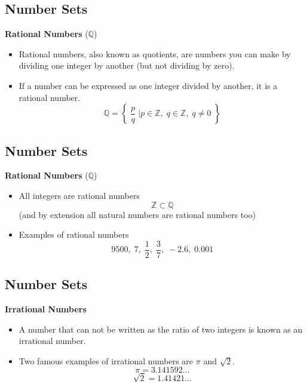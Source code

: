 \documentclass[11pt,a4paper,titlepage,oneside,openany]{article}
\numberwithin{equation}{section}
\numberwithin{algorithm}{section}
\numberwithin{figure}{section}
\numberwithin{table}{section}
\begin{document}
{\subsection{Number Sets}

\textbf{Rational Numbers} ($\mathbb{Q}$)
\begin{itemize}
\item Rational numbers, also known as quotients, are numbers you can make by dividing one integer by another (but not dividing by zero). 
\item If a number can be expressed as one integer divided by another, it is a rational number.
\[ \mathbb{Q} = \left\{\; \frac{p}{q} \;\bigg| p \in \mathbb{Z},\; q \in \mathbb{Z},\; q \neq 0  \;   \right\}   \]
\end{itemize}


\subsection{Number Sets}

\textbf{Rational Numbers} ($\mathbb{Q}$)
\begin{itemize}
\item All integers are rational numbers 
\[ \mathbb{Z}  \subset \mathbb{Q}\]
(and by extension all natural numbers are rational numbers too)
\item Examples of rational numbers
\[ 9500,\;7,\; \frac{1}{2} ,\; \frac{3}{7},\; -2.6 ,\; 0.001\] 
\end{itemize}


\subsection{Number Sets}

\textbf{Irrational Numbers} 
\begin{itemize}
\item A number that can not be written as the ratio of two integers is known as an irrational number.
\item Two famous examples of irrational numbers are $\pi$ and $\sqrt{2}$. 
\[\pi = 3.141592\ldots\]
\[\sqrt{2} = 1.41421\ldots\]
\end{itemize}


}
\end{document}
